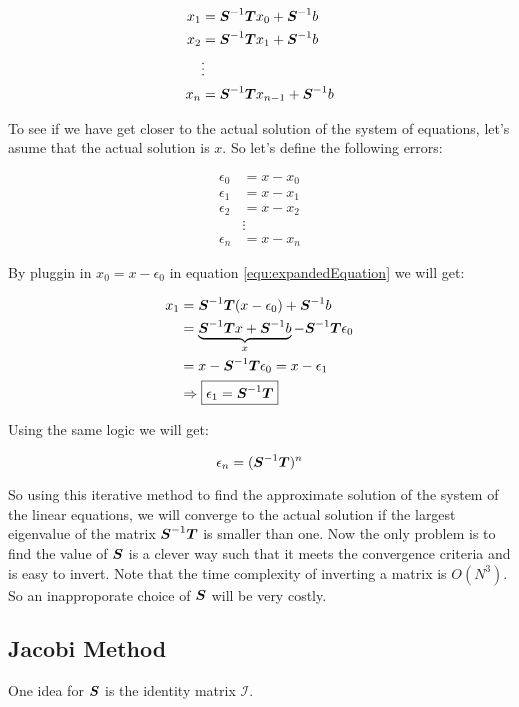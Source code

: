 \begin{align*}
	x_1 &= \boldsymbol{S}^{-1} \boldsymbol{T} x_0 + \boldsymbol{S}^{-1} b \\
	x_2 &= \boldsymbol{S}^{-1} \boldsymbol{T} x_1 + \boldsymbol{S}^{-1} b \\
	& \vdots \\
	x_n &= \boldsymbol{S}^{-1} \boldsymbol{T} x_{n-1} + \boldsymbol{S}^{-1} b
\end{align*}


To see if we have get closer to the actual solution of the system of equations, let's asume that the actual solution is $x$. So let's define the following errors:

\begin{align*}
	\epsilon_0 &= x - x_0 \\
	\epsilon_1 &= x - x_1 \\
	\epsilon_2 &= x - x_2 \\
	& \vdots \\
	\epsilon_n &= x - x_n 
\end{align*}

By pluggin in $x_0 = x - \epsilon_0 $ in equation \ref{equ:expandedEquation} we will get:

\begin{align*}
	x_1 &= \boldsymbol{S}^{-1} \boldsymbol{T} (x-\epsilon_0) + \boldsymbol{S}^{-1}b \\ 
	&= \underbrace{\boldsymbol{S}^{-1}\boldsymbol{T}x + \boldsymbol{S}^{-1}b}_{x} - \boldsymbol{S}^{-1}\boldsymbol{T}\epsilon_0 \\
	&= x - \boldsymbol{S}^{-1}\boldsymbol{T}\epsilon_0 = x - \epsilon_1 \\
	&\Rightarrow \boxed{ \epsilon_1 = \boldsymbol{S}^{-1}\boldsymbol{T} }
\end{align*}

Using the same logic we will get:

\begin{equation}
	\epsilon_n = (\boldsymbol{S}^{-1}\boldsymbol{T})^n
\end{equation}

So using this iterative method to find the approximate solution of the system of the linear equations, we will converge to the actual solution if the largest eigenvalue of the matrix $\boldsymbol{S}^{-1}\boldsymbol{T}$ is smaller than one. Now the only problem is to find the value of $\boldsymbol{S}$ is a clever way such that it meets the convergence criteria and is easy to invert. Note that the time complexity of inverting a matrix is $O(N^3)$. So an inapproporate choice of $\boldsymbol{S}$ will be very costly.

\subsection{Jacobi Method}
One idea for $\boldsymbol{S}$ is the identity matrix $\mathcal{I}$.

